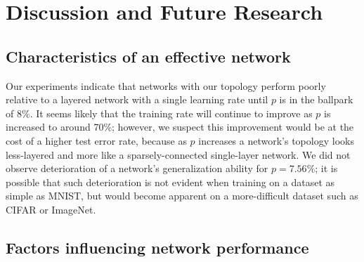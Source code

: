 \documentclass[format=sigconf]{acmart}
\begin{document}
\section{Discussion and Future Research}

\subsection{Characteristics of an effective network}

Our experiments indicate that networks with our topology perform poorly relative to a layered network with a single learning rate until $p$ is in the ballpark of $8\%$. It seems likely that the training rate will continue to improve as $p$ is increased to around 70\%; however, we suspect this improvement would be at the cost of a higher test error rate, because as $p$ increases a network's topology looks less-layered and more like a sparsely-connected single-layer network. We did not observe deterioration of a network's generalization ability for $p=7.56\%$; it is possible that such deterioration is not evident when training on a dataset as simple as MNIST, but would become apparent on a more-difficult dataset such as CIFAR or ImageNet.

\subsection{Factors influencing network performance}
\label{sec:disc_factors}
\end{document}
